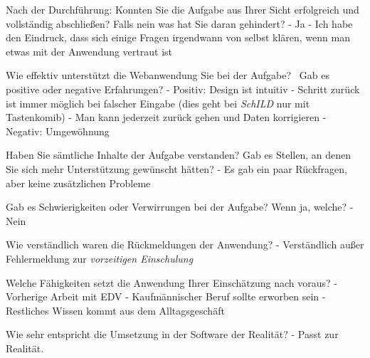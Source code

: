 Nach der Durchführung:		
Konnten Sie die Aufgabe aus Ihrer Sicht erfolgreich und vollständig abschließen? Falls nein was hat Sie daran gehindert?	
- Ja
- Ich habe den Eindruck, dass sich einige Fragen irgendwann von selbst klären, wenn man etwas mit der Anwendung vertraut ist















Wie effektiv unterstützt die Webanwendung Sie bei der Aufgabe?  Gab es positive oder negative Erfahrungen?	
- Positiv: Design ist intuitiv
- Schritt zurück ist immer möglich bei falscher Eingabe (dies geht bei \textit{SchILD} nur mit Tastenkomib)
 - Man kann jederzeit zurück gehen und Daten korrigieren
- Negativ: Umgewöhnung	











Haben Sie sämtliche Inhalte der Aufgabe verstanden? Gab es Stellen, an denen Sie sich mehr Unterstützung gewünscht hätten?	
- Es gab ein paar Rückfragen, aber keine zusätzlichen Probleme	




Gab es Schwierigkeiten oder Verwirrungen bei der Aufgabe? Wenn ja, welche?		
- Nein















Wie verständlich waren die Rückmeldungen der Anwendung?	
- Verständlich außer Fehlermeldung zur \textit{vorzeitigen Einschulung}











Welche Fähigkeiten setzt die Anwendung Ihrer Einschätzung nach voraus?	
- Vorherige Arbeit mit EDV
- Kaufmännischer Beruf sollte erworben sein
- Restliches Wissen kommt aus dem Alltagsgeschäft	

Wie sehr entspricht die Umsetzung in der Software der Realität? 	
- 
Passt zur Realität.	














